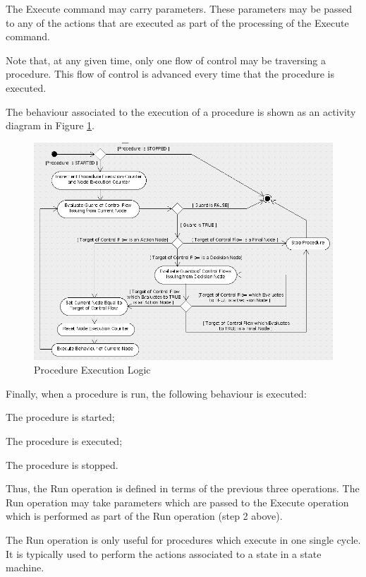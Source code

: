 \documentclass[a4paper,10pt]{article}
\newenvironment{fw_enumerate}					%
{\begin{enumerate}
  \setlength{\itemsep}{1mm}
  \setlength{\parskip}{0pt}
  \setlength{\parsep}{0pt}}
{\end{enumerate}}
\begin{document}
The Execute command may carry parameters. These parameters may be passed to any of the
actions that are executed as part of the processing of the Execute command.

Note that, at any given time, only one flow of control may be traversing a procedure. This flow
of control is advanced every time that the procedure is executed.

The behaviour associated to the execution of a procedure is shown as an activity diagram in
Figure \ref{fig:PR_Execution}.

\begin{figure}[ht]
 \centering
 \includegraphics[scale=0.4,keepaspectratio=true]{../images/PR_Execution.png}
 \caption{Procedure Execution Logic}
 \label{fig:PR_Execution}
\end{figure}

Finally, when a procedure is run, the following behaviour is executed:

\begin{fw_enumerate} 
\item The procedure is started;
\item The procedure is executed;
\item The procedure is stopped. 
\end{fw_enumerate}

Thus, the Run operation is defined in terms of the previous three operations. The Run
operation may take parameters which are passed to the Execute operation which is performed
as part of the Run operation (step 2 above).

The Run operation is only useful for procedures which execute in one single cycle. It is
typically used to perform the actions associated to a state in a state machine.
\end{document}
